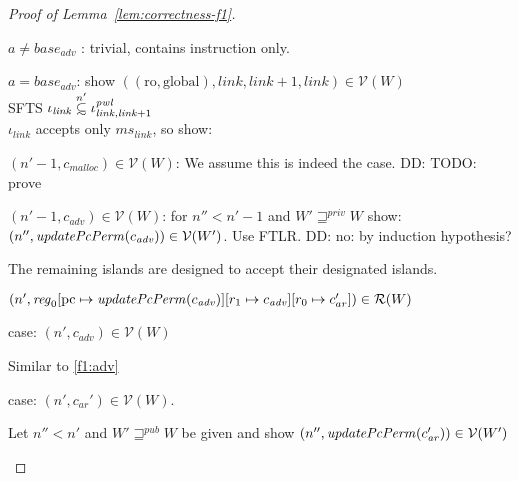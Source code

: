 \documentclass[a4paper]{article}
\newcommand{\update}[2]{[#1 \mapsto #2]}
\newcommand\subsetsim{\mathrel{\ooalign{\raise.2ex\hbox{$\subset$}\cr
      \hidewidth\lower.8ex\hbox{\scalebox{0.9}{$\sim$}}\hidewidth\cr}}}
\newcommand{\nsubsim}[1][n]{\stackrel{\tiny{#1}}{\subsetsim}}
\newcommand\dominique[1]{{\color{purple} \sf \footnotesize {DD: #1}}\\}
\newcommand{\var}[1]{\mathit{#1}}
\newcommand{\hs}{\var{ms}}
\newcommand{\ms}{\hs}
\newcommand{\pcreg}{\mathrm{pc}}
\newcommand{\start}{\var{base}}
\newcommand{\reg}{\var{reg}}
\newcommand{\adv}{\var{adv}}
\newcommand{\link}{\var{link}}
\newcommand{\pwl}{\var{pwl}}
\newcommand{\plainfun}[2]{
  \ifthenelse{\equal{#2}{}}
  {\mathit{#1}}
  {\mathit{#1}(#2)}
}
\newcommand{\updatePcPerm}[1]{\plainfun{updatePcPerm}{#1}}
\newcommand{\futurewk}{\mathbin{\sqsupseteq}^{\var{pub}}}
\newcommand{\futurestr}{\mathbin{\sqsupseteq}^{\var{priv}}}
\newcommand{\codelabel}[1]{\mathit{#1}}
\newcommand{\malloc}{\codelabel{malloc}}
\newcommand{\asmType}{\plaindom{AsmType}}
\newcommand{\plaindom}[1]{\mathrm{#1}}
\newcommand{\intr}[2]{\mathcal{#1}}
\newcommand{\valueintr}[1]{\intr{V}{#1}}
\newcommand{\regintr}[1]{\intr{R}{#1}}
\newcommand{\stdvr}{\valueintr{\asmType}}
\newcommand{\stdrr}{\regintr{\asmType}}
\newcommand{\npair}[2][n]{\left(#1,#2 \right)}
\newcommand{\plainperm}[1]{\mathrm{#1}}
\newcommand{\readonly}{\plainperm{ro}}
\newcommand{\glob}{\plainperm{global}}
\begin{document}
\begin{proof}[Proof of Lemma~\ref{lem:correctness-f1}]
\begin{enumproof}[resume]
\begin{enumproof}
\begin{enumproof}
                      \begin{enumproof}
                      \item $a \neq \start_\adv$ : trivial, contains instruction only.
                      \item $a = \start_\adv$: show $((\readonly,\glob),\link,\link+1,\link) \in \stdvr(W)$\\
                        SFTS $\iota_{\link} \nsubsim[n'] \iota^\pwl_{\link,\link+1}$\\
                        $\iota_{\link}$ accepts only $\ms_\link$, so show:
                        \begin{enumproof}
                        \item $\npair[n'-1]{c_\malloc} \in \stdvr(W)$: We assume
                          this is indeed the case.\dominique{TODO: prove}
                        \item $\npair[n'-1]{c_\adv} \in \stdvr(W)$: for $n'' <
                          n'-1$ and $W' \futurestr W$ show:
                          \\$\npair[n'']{\updatePcPerm{c_\adv}} \in \stdvr(W')$.
                          Use FTLR.\dominique{no: by induction hypothesis?} \label{f1:adv}
                        \end{enumproof}
                      \end{enumproof}
                    \item The remaining islands are designed to accept their designated islands.
                    \end{enumproof}
                  \end{enumproof}
                \item $\npair[n']{\reg_0\update{\pcreg}{\updatePcPerm{c_{\var{adv}}}}\update{r_1}{c_{\var{adv}}}\update{r_0}{c_{ar}'}} \in \stdrr(W)$
                  \begin{enumproof}
                  \item case: $\npair[n']{c_{\var{adv}}} \in \stdvr(W)$
                    \begin{enumproof}
                    \item Similar to \ref{f1:adv}
                    \end{enumproof}
                  \item case: $\npair[n']{c_{\var{ar}}'} \in \stdvr(W)$.
                    \begin{enumproof}
                    \item Let $n'' < n'$ and $W' \futurewk W$ be given and show $\npair[n'']{\updatePcPerm{c_{\var{ar}}'}} \in \stdvr(W')$\\

\end{enumproof}
\end{enumproof}
\end{enumproof}
\end{proof}
\end{document}
